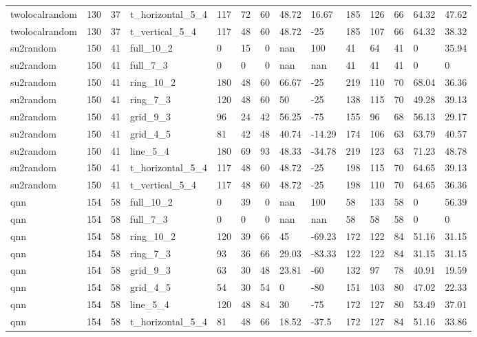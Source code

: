\begin{longtable}{lrrlllrllllrll}
twolocalrandom & 130 & 37 & t\_horizontal\_5\_4 & 117 & 72 & 60 & 48.72 & 16.67 & 185 & 126 & 66 & 64.32 & 47.62 \\
twolocalrandom & 130 & 37 & t\_vertical\_5\_4 & 117 & 48 & 60 & 48.72 & -25 & 185 & 107 & 66 & 64.32 & 38.32 \\
su2random & 150 & 41 & full\_10\_2 & 0 & 15 & 0 & nan & 100 & 41 & 64 & 41 & 0 & 35.94 \\
su2random & 150 & 41 & full\_7\_3 & 0 & 0 & 0 & nan & nan & 41 & 41 & 41 & 0 & 0 \\
su2random & 150 & 41 & ring\_10\_2 & 180 & 48 & 60 & 66.67 & -25 & 219 & 110 & 70 & 68.04 & 36.36 \\
su2random & 150 & 41 & ring\_7\_3 & 120 & 48 & 60 & 50 & -25 & 138 & 115 & 70 & 49.28 & 39.13 \\
su2random & 150 & 41 & grid\_9\_3 & 96 & 24 & 42 & 56.25 & -75 & 155 & 96 & 68 & 56.13 & 29.17 \\
su2random & 150 & 41 & grid\_4\_5 & 81 & 42 & 48 & 40.74 & -14.29 & 174 & 106 & 63 & 63.79 & 40.57 \\
su2random & 150 & 41 & line\_5\_4 & 180 & 69 & 93 & 48.33 & -34.78 & 219 & 123 & 63 & 71.23 & 48.78 \\
su2random & 150 & 41 & t\_horizontal\_5\_4 & 117 & 48 & 60 & 48.72 & -25 & 198 & 115 & 70 & 64.65 & 39.13 \\
su2random & 150 & 41 & t\_vertical\_5\_4 & 117 & 48 & 60 & 48.72 & -25 & 198 & 110 & 70 & 64.65 & 36.36 \\
qnn & 154 & 58 & full\_10\_2 & 0 & 39 & 0 & nan & 100 & 58 & 133 & 58 & 0 & 56.39 \\
qnn & 154 & 58 & full\_7\_3 & 0 & 0 & 0 & nan & nan & 58 & 58 & 58 & 0 & 0 \\
qnn & 154 & 58 & ring\_10\_2 & 120 & 39 & 66 & 45 & -69.23 & 172 & 122 & 84 & 51.16 & 31.15 \\
qnn & 154 & 58 & ring\_7\_3 & 93 & 36 & 66 & 29.03 & -83.33 & 122 & 122 & 84 & 31.15 & 31.15 \\
qnn & 154 & 58 & grid\_9\_3 & 63 & 30 & 48 & 23.81 & -60 & 132 & 97 & 78 & 40.91 & 19.59 \\
qnn & 154 & 58 & grid\_4\_5 & 54 & 30 & 54 & 0 & -80 & 151 & 103 & 80 & 47.02 & 22.33 \\
qnn & 154 & 58 & line\_5\_4 & 120 & 48 & 84 & 30 & -75 & 172 & 127 & 80 & 53.49 & 37.01 \\
qnn & 154 & 58 & t\_horizontal\_5\_4 & 81 & 48 & 66 & 18.52 & -37.5 & 172 & 127 & 84 & 51.16 & 33.86 \\

\end{longtable}
